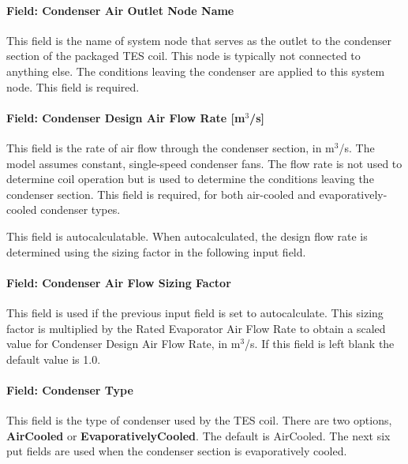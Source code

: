 \paragraph{Field: Condenser Air Outlet Node Name}\label{field-condenser-air-outlet-node-name}

This field is the name of system node that serves as the outlet to the condenser section of the packaged TES coil. This node is typically not connected to anything else. The conditions leaving the condenser are applied to this system node. This field is required.

\paragraph{Field: Condenser Design Air Flow Rate {[}m\(^{3}\)/s{]}}\label{field-condenser-design-air-flow-rate-m3s}

This field is the rate of air flow through the condenser section, in m\(^{3}\)/s. The model assumes constant, single-speed condenser fans. The flow rate is not used to determine coil operation but is used to determine the conditions leaving the condenser section. This field is required, for both air-cooled and evaporatively-cooled condenser types.

This field is autocalculatable. When autocalculated, the design flow rate is determined using the sizing factor in the following input field.

\paragraph{Field: Condenser Air Flow Sizing Factor}\label{field-condenser-air-flow-sizing-factor}

This field is used if the previous input field is set to autocalculate. This sizing factor is multiplied by the Rated Evaporator Air Flow Rate to obtain a scaled value for Condenser Design Air Flow Rate, in m\(^{3}\)/s. If this field is left blank the default value is 1.0.

\paragraph{Field: Condenser Type}\label{field-condenser-type-5}

This field is the type of condenser used by the TES coil. There are two options, \textbf{AirCooled} or \textbf{EvaporativelyCooled}. The default is AirCooled. The next six put fields are used when the condenser section is evaporatively cooled.

